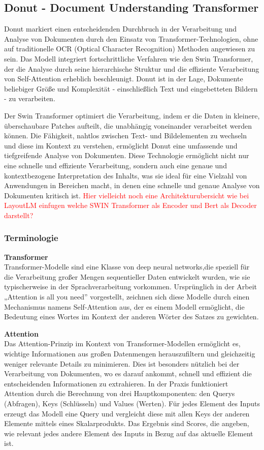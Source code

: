 \documentclass[12pt,a4paper,twoside]{article}
\newcommand\myworries[1]{\textcolor{red}{#1}}
\newcommand{\smallbold}[1]{\noindent\textbf{\small #1}}
\begin{document}
\subsection{Donut - Document Understanding Transformer}
Donut markiert einen entscheidenden Durchbruch in der Verarbeitung und Analyse von Dokumenten durch den Einsatz von Transformer-Technologien, ohne auf traditionelle OCR (Optical Character Recognition) Methoden angewiesen zu sein. Das Modell integriert fortschrittliche Verfahren wie den Swin Transformer, der die Analyse durch seine hierarchische Struktur und die effiziente Verarbeitung von Self-Attention erheblich beschleunigt. Donut ist in der Lage, Dokumente beliebiger Größe und Komplexität - einschließlich Text und eingebetteten Bildern - zu verarbeiten.

Der Swin Transformer optimiert die Verarbeitung, indem er die Daten in kleinere, überschaubare Patches aufteilt, die unabhängig voneinander verarbeitet werden können. Die Fähigkeit, nahtlos zwischen Text- und Bildelementen zu wechseln und diese im Kontext zu verstehen, ermöglicht Donut eine umfassende und tiefgreifende Analyse von Dokumenten. Diese Technologie ermöglicht nicht nur eine schnelle und effiziente Verarbeitung, sondern auch eine genaue und kontextbezogene Interpretation des Inhalts, was sie ideal für eine Vielzahl von Anwendungen in Bereichen macht, in denen eine schnelle und genaue Analyse von Dokumenten kritisch ist.
\myworries{Hier vielleicht noch eine Architekturubersicht wie bei LayoutLM einfugen welche SWIN Transformer als Encoder und Bert als Decoder darstellt?}
\subsubsection{Terminologie}

\smallbold{Transformer}\\
Transformer-Modelle sind eine Klasse von deep neural networks,die speziell für die Verarbeitung großer Mengen sequentieller Daten entwickelt wurden, wie sie typischerweise in der Sprachverarbeitung vorkommen. Ursprünglich in der Arbeit „Attention is all you need” \cite{Attention-Is-All-You-Need} vorgestellt, zeichnen sich diese Modelle durch einen Mechanismus namens Self-Attention aus, der es einem Modell ermöglicht, die Bedeutung eines Wortes im Kontext der anderen Wörter des Satzes zu gewichten.

\smallbold{Attention}\\
Das Attention-Prinzip im Kontext von Transformer-Modellen ermöglicht es, wichtige Informationen aus großen Datenmengen herauszufiltern und gleichzeitig weniger relevante Details zu minimieren. Dies ist besonders nützlich bei der Verarbeitung von Dokumenten, wo es darauf ankommt, schnell und effizient die entscheidenden Informationen zu extrahieren. 
In der Praxis funktioniert Attention durch die Berechnung von drei Hauptkomponenten: den Querys (Abfragen), Keys (Schlüsseln) und Values (Werten). Für jedes Element des Inputs erzeugt das Modell eine Query und vergleicht diese  mit allen Keys der anderen Elemente mittels eines Skalarprodukts. Das Ergebnis sind Scores, die angeben, wie relevant jedes andere Element des Inputs in Bezug auf das aktuelle Element ist.
\end{document}
